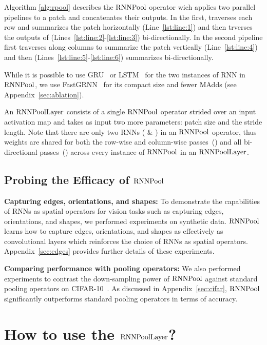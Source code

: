 \documentclass[10pt]{article}
\newcommand{\rpool}{\ensuremath{{\rm RNNPool}}\xspace}
\newcommand{\rpoollayer}{\ensuremath{{\rm RNNPoolLayer}}\xspace}
\begin{document}
Algorithm \ref{alg:rpool} describes the
\rpool operator wich applies two parallel pipelines to a patch and
concatenates their outputs. In the first,  traverses
each row and summarizes the patch horizontally (Line~\ref{lst:line:1})
and then  trverses the outputs of 
(Lines~\ref{lst:line:2}-\ref{lst:line:3}) bi-directionally. In the
second pipeline  first traverses along columns to
summarize the patch vertically (Line~\ref{lst:line:4}) and then
 (Lines~\ref{lst:line:5}-\ref{lst:line:6}) summarizes
bi-directionally.


While it is possible to use GRU~\citep{cho2014learning} or
LSTM~\citep{hochreiter1997long} for the two instances of RNN in \rpool,
we use FastGRNN~\citep{kusupati2018fastgrnn} for its compact size and
fewer MAdds (see Appendix~\ref{sec:ablation}).

An \rpoollayer consists of a single \rpool operator strided over an
input activation map and takes as input two more parameters: patch
size and the stride length.  Note that there are only two RNNs
( \& ) in an \rpool operator, thus
weights are shared for both the row-wise and column-wise
passes~() and all bi-directional
passes~() across every instance of \rpool in an
\rpoollayer.


\subsection{Probing the Efficacy of \rpool}

\textbf{Capturing edges, orientations, and shapes:} To demonstrate the
capabilities of RNNs as spatial operators for vision tasks such as
capturing edges, orientations, and shapes, we performed experiments on
synthetic data. \rpool learns how to capture edges, orientations, and
shapes as effectively as convolutional layers which reinforces the
choice of RNNs as spatial operators. Appendix~\ref{sec:edges} provides
further details of these experiments.

\textbf{Comparing performance with pooling operators:} We also
performed experiments to contrast the down-sampling power of \rpool
against standard pooling operators on
CIFAR-10~\citep{krizhevsky2009learning}. As discussed in Appendix~\ref{sec:cifar}, \rpool significantly outperforms standard pooling operators in terms of accuracy.

 \vspace{-5pt}
\section{How to use the \rpoollayer?}
\label{sec:usage}
\vspace{-5pt}
\end{document}

